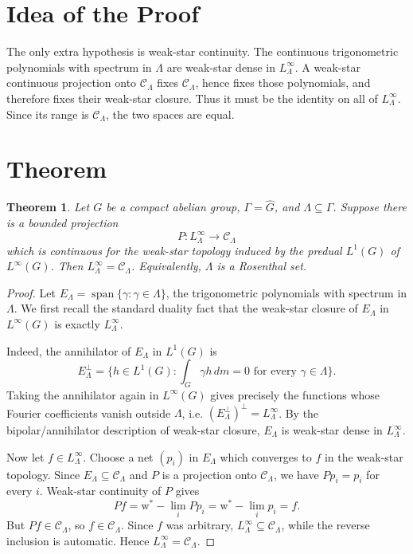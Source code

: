 \documentclass[11pt]{article}
\newtheorem{theorem}{Theorem}
\newcommand{\Ccal}{\mathcal C}
\newcommand{\Lin}{\operatorname{span}}
\begin{document}
\section*{Idea of the Proof}

The only extra hypothesis is weak-star continuity. The continuous
trigonometric polynomials with spectrum in \(\Lambda\) are weak-star dense in
\(L^\infty_\Lambda\). A weak-star continuous projection onto
\(\Ccal_\Lambda\) fixes \(\Ccal_\Lambda\), hence fixes those polynomials, and
therefore fixes their weak-star closure. Thus it must be the identity on all of
\(L^\infty_\Lambda\). Since its range is \(\Ccal_\Lambda\), the two spaces are
equal.

\section*{Theorem}

\begin{theorem}
Let \(G\) be a compact abelian group, \(\Gamma=\widehat G\), and
\(\Lambda\subseteq\Gamma\). Suppose there is a bounded projection
\[
P:L^\infty_\Lambda\longrightarrow \Ccal_\Lambda
\]
which is continuous for the weak-star topology induced by the predual
\(L^1(G)\) of \(L^\infty(G)\). Then \(L^\infty_\Lambda=\Ccal_\Lambda\).
Equivalently, \(\Lambda\) is a Rosenthal set.
\end{theorem}

\begin{proof}
Let \(E_\Lambda=\Lin\{\gamma:\gamma\in\Lambda\}\), the trigonometric
polynomials with spectrum in \(\Lambda\). We first recall the standard
duality fact that the weak-star closure of \(E_\Lambda\) in \(L^\infty(G)\) is
exactly \(L^\infty_\Lambda\).

Indeed, the annihilator of \(E_\Lambda\) in \(L^1(G)\) is
\[
E_\Lambda^\perp
=\{h\in L^1(G): \int_G \gamma h\,dm=0\text{ for every }\gamma\in\Lambda\}.
\]
Taking the annihilator again in \(L^\infty(G)\) gives precisely the functions
whose Fourier coefficients vanish outside \(\Lambda\), i.e.
\((E_\Lambda^\perp)^\perp=L^\infty_\Lambda\). By the bipolar/annihilator
description of weak-star closure, \(E_\Lambda\) is weak-star dense in
\(L^\infty_\Lambda\).

Now let \(f\in L^\infty_\Lambda\). Choose a net \((p_i)\) in \(E_\Lambda\)
which converges to \(f\) in the weak-star topology. Since
\(E_\Lambda\subseteq \Ccal_\Lambda\) and \(P\) is a projection onto
\(\Ccal_\Lambda\), we have \(Pp_i=p_i\) for every \(i\). Weak-star continuity
of \(P\) gives
\[
P f=\text{w}^*\!-\!\lim_i Pp_i
    =\text{w}^*\!-\!\lim_i p_i
    =f .
\]
But \(P f\in \Ccal_\Lambda\), so \(f\in \Ccal_\Lambda\). Since \(f\) was
arbitrary, \(L^\infty_\Lambda\subseteq \Ccal_\Lambda\), while the reverse
inclusion is automatic. Hence \(L^\infty_\Lambda=\Ccal_\Lambda\).
\end{proof}
\end{document}
